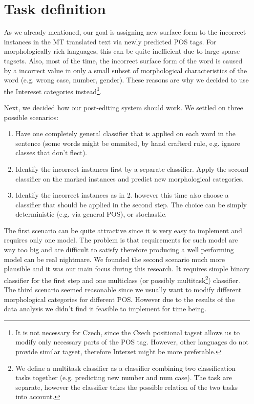 \section{Task definition}

As we already mentioned, our goal is assigning new surface form to the incorrect instances
in the MT translated text via newly predicted POS tags. For morphologically rich languages,
this can be quite inefficient due to large sparse tagsets. Also, most of the time,
the incorrect surface form of the word is caused by a incorrect value in only a small
subset of morphological characteristics of the word (e.g. wrong case, number, gender).
These reasons are why we decided to use the Intereset categories instead\footnote{It is
not necessary for Czech, since the Czech positional tagset allows us to modify only necessary
parts of the POS tag. However, other languages do not provide similar tagset, therefore
Interset might be more preferable.}.

Next, we decided how our post-editing system should work. We settled on three possible scenarios:
\begin{enumerate}
    \item Have one completely general classifier that is applied on each word in the sentence (some
        words might be ommited, by hand crafterd rule, e.g. ignore classes that don't flect).
    \item Identify the incorrect instances first by a separate classifier. Apply the second classifier
        on the marked instances and predict new morphological categories.
    \item Identify the incorrect instances as in 2. however this time also choose a classifier that
        should be applied in the second step. The choice can be simply deterministic (e.g. via general POS), or stochastic.
\end{enumerate}

The first scenario can be quite attractive since it is very easy to implement and requires only one model.
The problem is that requirements for such model are way too big and are difficult to satisfy therefore
producing a well performing model can be real nightmare.
We founded the second scenario much more plausible and it was our main focus during this research.
It requires simple binary classifier for the first step and one multiclass (or possibly multitask\footnote{We
define a multitask classifier as a classifier combining two classification tasks together (e.g. predicting new number and num case).
The task are separate, however the classifier takes the possible relation of the two tasks into account.}) classifier.
The third scenario seemed reasonable since we usually want to modify different morphological categories for different POS.
However due to the results of the data analysis we didn't find it feasible to implement for time being.

